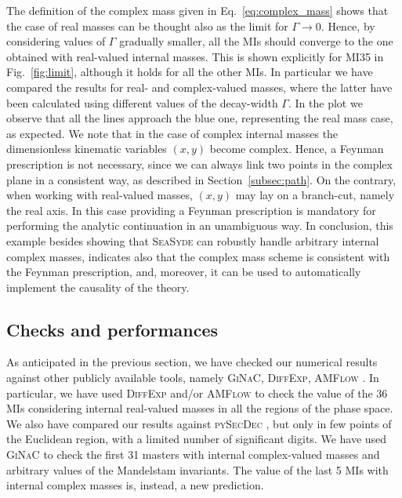 \documentclass[final,1p,times]{elsarticle}
\begin{document}
The definition of the complex mass given in Eq.~\ref{eq:complex_mass} shows that the case of real masses can be thought also as the limit for $\Gamma\to0$. Hence, by considering values of $\Gamma$ gradually smaller, all the MIs should converge to the one obtained with real-valued internal masses. This is shown explicitly for MI35 in Fig.~\ref{fig:limit}, although it holds for all the other MIs. In particular we have compared the results for real- and complex-valued masses, where the latter have been calculated using different values of the decay-width $\Gamma$. In the plot we observe that all the lines approach the blue one, representing the real mass case, as expected.
We note that in the case of complex internal masses the dimensionless kinematic variables $(x,y)$ become complex. Hence, a Feynman prescription is not necessary, since we can always link two points in the complex plane in a consistent way, as described in Section~\ref{subsec:path}. On the contrary, when working with real-valued masses, $(x,y)$ may lay on a branch-cut, namely the real axis. In this case providing a Feynman prescription is mandatory for performing the analytic continuation in an unambiguous way. In conclusion, this example besides showing that \textsc{SeaSyde} can robustly handle arbitrary internal complex masses, indicates also that the complex mass scheme is consistent with the Feynman prescription, and, moreover, it can be used to automatically implement the causality of the theory.



\subsection{Checks and performances}

As anticipated in the previous section, we have checked our numerical results against other publicly available tools, namely \textsc{GiNaC}, \textsc{DiffExp}, \textsc{AMFlow} \cite{Liu:2022chg}. In particular, we have used \textsc{DiffExp} and/or \textsc{AMFlow} to check the value of the 36 MIs considering internal real-valued masses in all the regions of the phase space. We also have compared our results against \textsc{pySecDec} \cite{Borowka:2017idc}, but only in few points of the Euclidean region, with a limited number of significant digits.
We have used \textsc{GiNaC} to check the first 31 masters with internal complex-valued masses and arbitrary values of the Mandelstam invariants. The value of the last 5 MIs with internal complex masses is, instead, a new prediction. 
\end{document}

